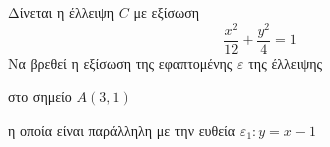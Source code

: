 Δίνεται η έλλειψη $ C $ με εξίσωση
\[ \frac{x^2}{12}+\frac{y^2}{4}=1 \]
Να βρεθεί η εξίσωση της εφαπτομένης $ \varepsilon $ της έλλειψης
\begin{alist}
\item στο σημείο $ A(3,1) $
\item η οποία είναι παράλληλη με την ευθεία $ \varepsilon_1:y=x-1 $
\end{alist}
